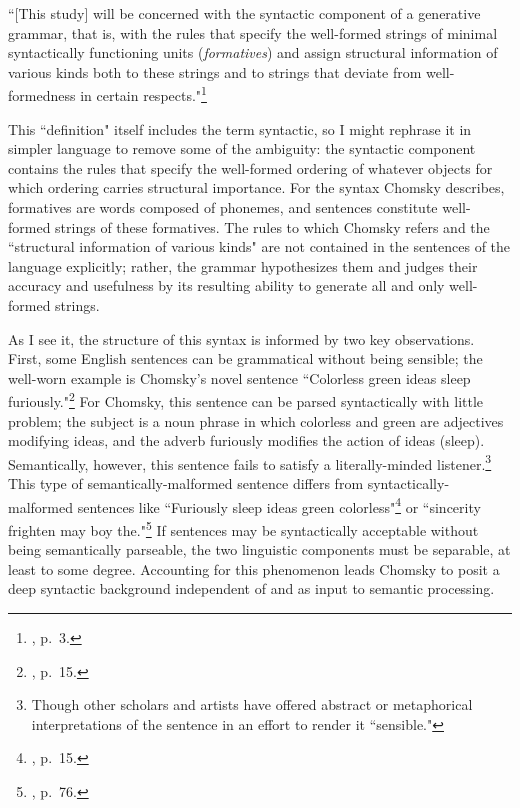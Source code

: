 ``[This study] will be concerned with the syntactic component of a generative grammar, that is, with the rules that specify the well-formed strings of minimal syntactically functioning units (\emph{formatives}) and assign structural information of various kinds both to these strings and to strings that deviate from well-formedness in certain respects."\footnote{\cite{chomsky1965}, p.\ 3.}

This ``definition" itself includes the term syntactic, so I might rephrase it in simpler language to remove some of the ambiguity: the syntactic component contains the rules that specify the well-formed ordering of whatever objects for which ordering carries structural importance.  For the syntax Chomsky describes, formatives are words composed of phonemes, and sentences constitute well-formed strings of these formatives.  The rules to which Chomsky refers and the ``structural information of various kinds" are not contained in the sentences of the language explicitly; rather, the grammar hypothesizes them and judges their accuracy and usefulness by its resulting ability to generate all and only well-formed strings.

As I see it, the structure of this syntax is informed by two key observations.  First, some English sentences can be grammatical without being sensible; the well-worn example is Chomsky's novel sentence ``Colorless green ideas sleep furiously."\footnote{\cite{chomsky1957}, p.\ 15.}  For Chomsky, this sentence can be parsed syntactically with little problem; the subject is a noun phrase in which colorless and green are adjectives modifying ideas, and the adverb furiously modifies the action of ideas (sleep).  Semantically, however, this sentence fails to satisfy a literally-minded listener.\footnote{Though other scholars and artists have offered abstract or metaphorical interpretations of the sentence in an effort to render it ``sensible."}  This type of semantically-malformed sentence differs from syntactically-malformed sentences like ``Furiously sleep ideas green colorless"\footnote{\cite{chomsky1957}, p.\ 15.} or ``sincerity frighten may boy the."\footnote{\cite{chomsky1965}, p.\ 76.}  If sentences may be syntactically acceptable without being semantically parseable, the two linguistic components must be separable, at least to some degree.  Accounting for this phenomenon leads Chomsky to posit a deep syntactic background independent of and as input to semantic processing.

